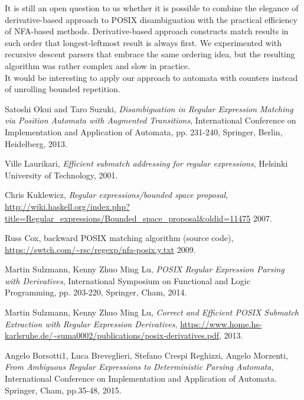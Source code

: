 \documentclass[AMA,STIX1COL]{WileyNJD-v2}
\begin{document}
It is still an open question to us
whether it is possible to combine the elegance of derivative-based approach to POSIX disambiguation
with the practical efficiency of NFA-based methods.
%
Derivative-based approach constructs match results in such order that longest-leftmost result is always first.
%
We experimented with recursive descent parsers that embrace the same ordering idea,
but the resulting algorithm was rather complex and slow in practice.
\\

It would be interesting to apply our approach to automata with counters
instead of unrolling bounded repetition.


\begin{thebibliography}{99}

    Satoshi Okui and Taro Suzuki,
    \textit{Disambiguation in Regular Expression Matching via Position Automata with Augmented Transitions},
    International Conference on Implementation and Application of Automata, pp. 231-240, Springer, Berlin, Heidelberg,
    2013.

    Ville Laurikari,
    \textit{Efficient submatch addressing for regular expressions},
    Helsinki University of Technology,
    2001.

    Chris Kuklewicz,
    \textit{Regular expressions/bounded space proposal},
    \url{http://wiki.haskell.org/index.php?title=Regular_expressions/Bounded_space_proposal&oldid=11475}
    2007.

    Russ Cox,
    backward POSIX matching algorithm (source code),
    \url{https://swtch.com/~rsc/regexp/nfa-posix.y.txt}
    2009.

    Martin Sulzmann, Kenny Zhuo Ming Lu,
    \textit{POSIX Regular Expression Parsing with Derivatives},
    International Symposium on Functional and Logic Programming, pp. 203-220, Springer, Cham,
    2014.

    Martin Sulzmann, Kenny Zhuo Ming Lu,
    \textit{Correct and Efficient POSIX Submatch Extraction with Regular Expression Derivatives},
    \url{https://www.home.hs-karlsruhe.de/~suma0002/publications/posix-derivatives.pdf},
    2013.

    Angelo Borsotti1, Luca Breveglieri, Stefano Crespi Reghizzi, Angelo Morzenti,
    \textit{From Ambiguous Regular Expressions to Deterministic Parsing Automata},
    International Conference on Implementation and Application of Automata. Springer, Cham, pp.35-48,
    2015.


\end{thebibliography}
\end{document}
